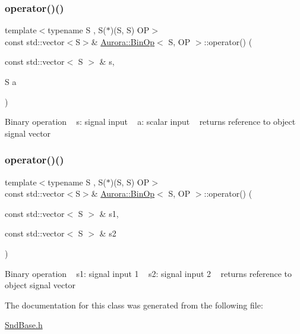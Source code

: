\subsubsection{\texorpdfstring{operator()()}{operator()()}\hspace{0.1cm}{\footnotesize\ttfamily [2/3]}}
{\footnotesize\ttfamily template$<$typename S , S($\ast$)(\+S, S) OP$>$ \\
const std\+::vector$<$S$>$\& \hyperlink{class_aurora_1_1_bin_op}{Aurora\+::\+Bin\+Op}$<$ S, OP $>$\+::operator() (\begin{DoxyParamCaption}\item[{const std\+::vector$<$ S $>$ \&}]{s,  }\item[{S}]{a }\end{DoxyParamCaption})\hspace{0.3cm}{\ttfamily [inline]}}

Binary operation ~\newline
s\+: signal input ~\newline
a\+: scalar input ~\newline
returns reference to object signal vector \mbox{\label{class_aurora_1_1_bin_op_afd027823b576a0c4a66e7d119bfb01d4}} 
\subsubsection{\texorpdfstring{operator()()}{operator()()}\hspace{0.1cm}{\footnotesize\ttfamily [3/3]}}
{\footnotesize\ttfamily template$<$typename S , S($\ast$)(\+S, S) OP$>$ \\
const std\+::vector$<$S$>$\& \hyperlink{class_aurora_1_1_bin_op}{Aurora\+::\+Bin\+Op}$<$ S, OP $>$\+::operator() (\begin{DoxyParamCaption}\item[{const std\+::vector$<$ S $>$ \&}]{s1,  }\item[{const std\+::vector$<$ S $>$ \&}]{s2 }\end{DoxyParamCaption})\hspace{0.3cm}{\ttfamily [inline]}}

Binary operation ~\newline
s1\+: signal input 1 ~\newline
s2\+: signal input 2 ~\newline
returns reference to object signal vector 

The documentation for this class was generated from the following file\+:\begin{DoxyCompactItemize}
\item 
\hyperlink{_snd_base_8h}{Snd\+Base.\+h}\end{DoxyCompactItemize}
